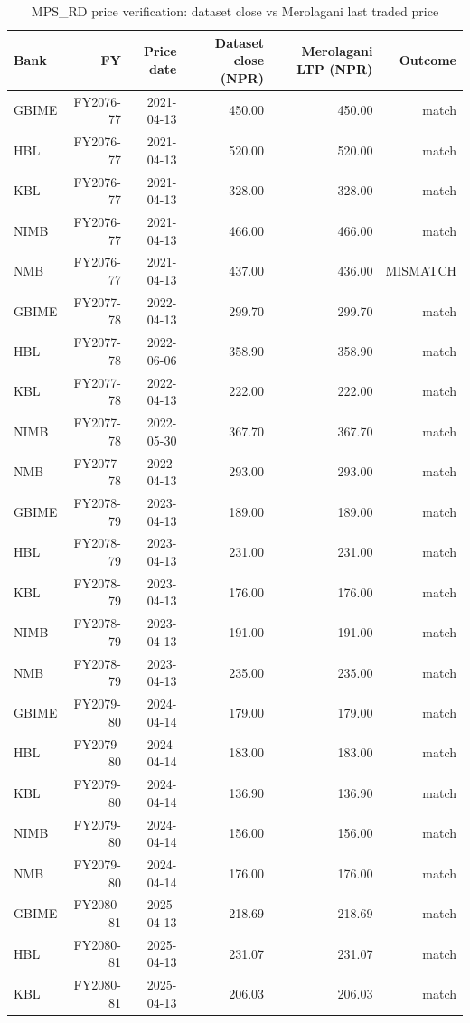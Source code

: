 \begin{table}[htbp]
\centering
\caption{MPS\_RD price verification: dataset close vs Merolagani last traded price}
\label{tab:a4_price_verification}
\begin{tabular}{lrrrrr}
\toprule
Bank & FY & Price date & Dataset close (NPR) & Merolagani LTP (NPR) & Outcome \\
\midrule
GBIME & FY2076-77 & 2021-04-13 & 450.00 & 450.00 & match \\
HBL & FY2076-77 & 2021-04-13 & 520.00 & 520.00 & match \\
KBL & FY2076-77 & 2021-04-13 & 328.00 & 328.00 & match \\
NIMB & FY2076-77 & 2021-04-13 & 466.00 & 466.00 & match \\
NMB & FY2076-77 & 2021-04-13 & 437.00 & 436.00 & MISMATCH \\
GBIME & FY2077-78 & 2022-04-13 & 299.70 & 299.70 & match \\
HBL & FY2077-78 & 2022-06-06 & 358.90 & 358.90 & match \\
KBL & FY2077-78 & 2022-04-13 & 222.00 & 222.00 & match \\
NIMB & FY2077-78 & 2022-05-30 & 367.70 & 367.70 & match \\
NMB & FY2077-78 & 2022-04-13 & 293.00 & 293.00 & match \\
GBIME & FY2078-79 & 2023-04-13 & 189.00 & 189.00 & match \\
HBL & FY2078-79 & 2023-04-13 & 231.00 & 231.00 & match \\
KBL & FY2078-79 & 2023-04-13 & 176.00 & 176.00 & match \\
NIMB & FY2078-79 & 2023-04-13 & 191.00 & 191.00 & match \\
NMB & FY2078-79 & 2023-04-13 & 235.00 & 235.00 & match \\
GBIME & FY2079-80 & 2024-04-14 & 179.00 & 179.00 & match \\
HBL & FY2079-80 & 2024-04-14 & 183.00 & 183.00 & match \\
KBL & FY2079-80 & 2024-04-14 & 136.90 & 136.90 & match \\
NIMB & FY2079-80 & 2024-04-14 & 156.00 & 156.00 & match \\
NMB & FY2079-80 & 2024-04-14 & 176.00 & 176.00 & match \\
GBIME & FY2080-81 & 2025-04-13 & 218.69 & 218.69 & match \\
HBL & FY2080-81 & 2025-04-13 & 231.07 & 231.07 & match \\
KBL & FY2080-81 & 2025-04-13 & 206.03 & 206.03 & match \\

\end{tabular}
\end{table}
